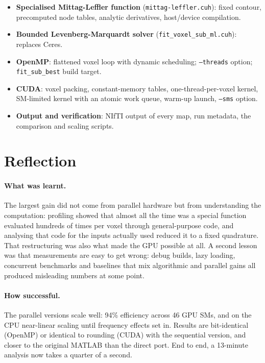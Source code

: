 \documentclass[11pt]{article}
\begin{document}
\begin{itemize}
    \item \textbf{Specialised Mittag-Leffler function} (\texttt{mittag-leffler.cuh}): fixed contour,
        precomputed node tables, analytic derivatives, host/device compilation.
    \item \textbf{Bounded Levenberg-Marquardt solver} (\texttt{fit\_voxel\_sub\_ml.cuh}): replaces Ceres.
    \item \textbf{OpenMP}: flattened voxel loop with dynamic scheduling; \texttt{--threads} option;
        \texttt{fit\_sub\_best} build target.
    \item \textbf{CUDA}: voxel packing, constant-memory tables, one-thread-per-voxel kernel,
        SM-limited kernel with an atomic work queue, warm-up launch, \texttt{--sms} option.
    \item \textbf{Output and verification}: NIfTI output of every map, run metadata, the comparison
        and scaling scripts.
\end{itemize}

\section{Reflection}
\label{sec:reflection}

\paragraph{What was learnt.} The largest gain did not come from parallel hardware but from
understanding the computation: profiling showed that almost all the time was a special function
evaluated hundreds of times per voxel through general-purpose code, and analysing that code for
the inputs actually used reduced it to a fixed quadrature. That restructuring was also what made
the GPU possible at all. A second lesson was that measurements are easy to get wrong: debug
builds, lazy loading, concurrent benchmarks and baselines that mix algorithmic and parallel gains
all produced misleading numbers at some point.

\paragraph{How successful.} The parallel versions scale well: 94\% efficiency across 46 GPU SMs,
and on the CPU near-linear scaling until frequency effects set in. Results are bit-identical
(OpenMP) or identical to rounding (CUDA) with the sequential version, and closer to the original
MATLAB than the direct port. End to end, a 13-minute analysis now takes a quarter of a second.
\end{document}
